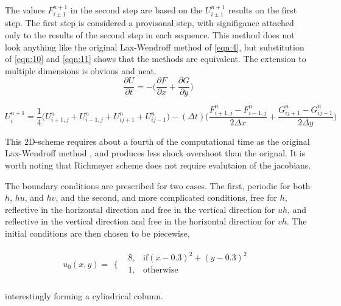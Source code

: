 The values $F_{i \pm 1}^{n+1}$ in the second step are based on the $U_{i \pm 1}^{n+1}$ results on the first step. The first step is considered
a provisonal step, with signifigance attached only to the results of the second step in each sequence. This method does not look anything like the original
Lax-Wendroff method of \eqref{eqn:4}, but substitution of \eqref{eqn:10} and \eqref{eqn:11} shows that the methods are equivalent. 
\newline
The extension to multiple dimensions is obvious and neat.
\begin{equation}\label{eqn:10}
\frac{\partial U}{\partial t} = - \Big( \frac{\partial F}{\partial x} + \frac{\partial G}{\partial y} \Big)
\end{equation}

\begin{dmath}\label{eqn:11}
U_{i}^{n+1} = \frac{1}{4} \Big( U_{i+1,j}^{n} + U_{i-1,j}^{n} + U_{ij+1}^{n} + U_{ij-1}^{n} \Big) 
- (\Delta t) \Big( \frac{ F_{i+1,j}^{n} - F_{i-1,j}^{n} }{2 \Delta x}  + \frac{ G_{ij+1}^{n} - G_{ij-1}^{n} }{ 2 \Delta y }  \Big)
\end{dmath} 

This 2D-scheme requires about a fourth of the computational time as the original Lax-Wendroff method \cite{Roach}, and produces less shock
 overshoot than the orignal. It is worth noting that Richmeyer scheme does not require evalutaion
 of the jacobians. 
\newline

The boundary conditions are prescribed for two cases. The first, periodic for both $h$, $hu$, and $hv$, and the second,
 and more complicated conditions, free for $h$, reflective in the horizontal direction and free in the vertical direction 
for $uh$, and reflective in the vertical direction and free in the horizontal direction for $vh$. 
The initial conditions are then chosen to be piecewise, 

\begin{equation}\label{eqn:12}
u_0(x,y)=
\begin{array}{ll}
\Big\{ & 
\begin{array}{ll}
 8, & \text{if} (x-0.3)^2+(y-0.3)^2 \\
 1, & \text{otherwise} \\
\end{array}
\end{array}
\end{equation}

interestingly forming a cylindrical column.
